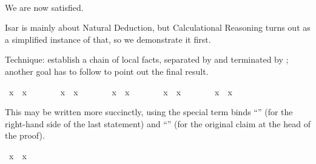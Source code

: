 \begin{isabellebody}
\ \isamarkupfalse%
\isamarkupfalse%
%
\begin{isamarkuptxt}%
We are now satisfied.%
\end{isamarkuptxt}%
\isamarkuptrue%
\isamarkupfalse%
%
\isamarkuptrue%
%
\begin{isamarkuptext}%
Isar is mainly about Natural Deduction, but Calculational Reasoning
  turns out as a simplified instance of that, so we demonstrate it
  first.%
\end{isamarkuptext}%
\isamarkuptrue%
%
\isamarkuptrue%
%
\begin{isamarkuptext}%
Technique: establish a chain of local facts, separated by 
  and terminated by ; another goal has to follow to point
  out the final result.%
\end{isamarkuptext}%
\isamarkuptrue%
\ {\isachardoublequote}x{}\ {\isacharequal}\ x{}{\isachardoublequote}\isanewline
\isamarkupfalse%
\ {\isacharminus}\ \ %
\isanewline
\ \ \isamarkupfalse%
\ {\isachardoublequote}x{}\ {\isacharequal}\ x{}{\isachardoublequote}\ \isamarkupfalse%
\isanewline
\ \ \isamarkupfalse%
\isanewline
\ \ \isamarkupfalse%
\ {\isachardoublequote}x{}\ {\isacharequal}\ x{}{\isachardoublequote}\ \isamarkupfalse%
\isanewline
\ \ \isamarkupfalse%
\isanewline
\ \ \isamarkupfalse%
\ {\isachardoublequote}x{}\ {\isacharequal}\ x{}{\isachardoublequote}\ \isamarkupfalse%
\isanewline
\ \ \isamarkupfalse%
\isanewline
\ \ \isamarkupfalse%
\ {\isachardoublequote}x{}\ {\isacharequal}\ x{}{\isachardoublequote}\ \isamarkupfalse%
\isacommand{{\isachardot}}\isanewline
\isamarkupfalse%
\isamarkupfalse%
%
\begin{isamarkuptext}%
This may be written more succinctly, using the special term binds
  ``\isa{{\isasymdots}}'' (for the right-hand side of the last statement) and
  ``'' (for the original claim at the head of the
  proof).%
\end{isamarkuptext}%
\isamarkuptrue%
\ {\isachardoublequote}x{}\ {\isacharequal}\ x{}{\isachardoublequote}\isanewline

\end{isabellebody}
